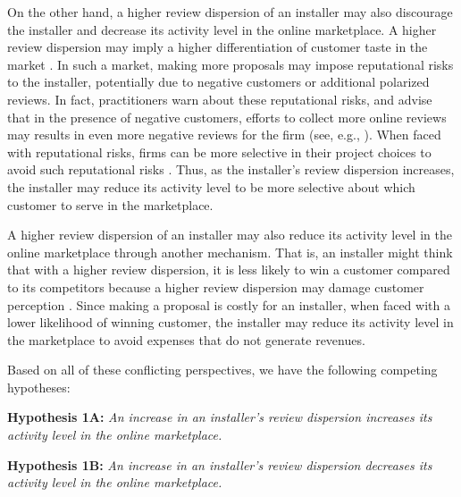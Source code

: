 \documentclass[msom,blindrev]{informs3}
\begin{document}
	On the other hand, a higher review dispersion of an installer may also discourage the installer and decrease its activity level in the online marketplace. A higher review dispersion may imply a higher differentiation of customer taste in the market \citep{clemons2006online}. In such a market, making more proposals may impose reputational risks to the installer, potentially due to negative customers or additional polarized reviews. In fact, practitioners warn about these reputational risks, and advise that in the presence of negative customers, efforts to collect more online reviews may results in even more negative reviews for the firm (see, e.g., \citep{Neil}). When faced with reputational risks, firms can be more selective in their project choices to avoid such reputational risks \citep{demirag2011risks,hirshleifer1992managerial}. Thus, as the installer's review dispersion increases, the installer may reduce its activity level to be more selective about which customer to serve in the marketplace.

A higher review dispersion of an installer may also reduce its activity level in the online marketplace through another mechanism. That is, an installer might think that with a higher review dispersion, it is less likely to win a customer compared to its competitors because a higher review dispersion may damage customer perception \citep{Zhu}. Since making a proposal is costly for an installer, when faced with a lower likelihood of winning customer, the installer may reduce its activity level in the marketplace to avoid expenses that do not generate revenues.

 Based on all of these conflicting perspectives, we have the following competing hypotheses:

	
	\noindent\textbf{Hypothesis 1A:} \emph{An increase in an installer's review dispersion increases its activity level in the online marketplace.}
	
	\noindent\textbf{Hypothesis 1B:} \emph{An increase in an installer's review dispersion decreases its activity level in the online marketplace.}


\end{document}
